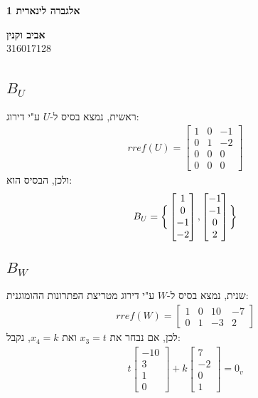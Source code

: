 \documentclass[a4paper, 12pt, leqno]{article}
\newcommand{\sub}[1]{\subsection{\underline{#1}}}
\newcommand{\eq}[1]{\begin{align*}#1\end{align*}}
\newcommand{\bigset}[1]{\bigg{\{} #1 \bigg{\}}}
\begin{document}
\begin{titlepage}
    \begin{center}
        \vspace*{4cm}
        {\fontsize{35pt}{35pt}\selectfont \textbf{אלגברה לינארית 1}}
        \vspace{0.4cm}

        {}
        \vfill

        {\Large\textbf{אביב וקנין}\\
        316017128}
    \end{center}
\end{titlepage}

\setcounter{section}{6}
\section{}
\sub{$B_U$}
ראשית, נמצא בסיס ל-$U$ ע"י דירוג:
\eq{
    rref(U)=
    \begin{bmatrix}
        1&0&-1\\
        0&1&-2\\
        0&0&0\\
        0&0&0
    \end{bmatrix}
}
ולכן, הבסיס הוא:
\eq{
    B_U=\bigset{\begin{bmatrix}
        1\\
        0\\
        -1\\
        -2
    \end{bmatrix}
    ,\begin{bmatrix}
        -1\\
        -1\\
        0\\
        2
    \end{bmatrix}}
}
\sub{$B_W$}
שנית, נמצא בסיס ל-$W$ ע"י דירוג מטריצת הפתרונות ההומוגנית:
\eq{
    rref(W)=
    \begin{bmatrix}
        1&0&10&-7\\
        0&1&-3&2
    \end{bmatrix}
}
לכן, אם נבחר את $x_3=t$ ואת $x_4=k$, נקבל:
\eq{
    t\begin{bmatrix}
        -10\\3\\1\\0
    \end{bmatrix}
    +k\begin{bmatrix}
        7\\-2\\0\\1
    \end{bmatrix}
    =0_v
}
\end{document}
